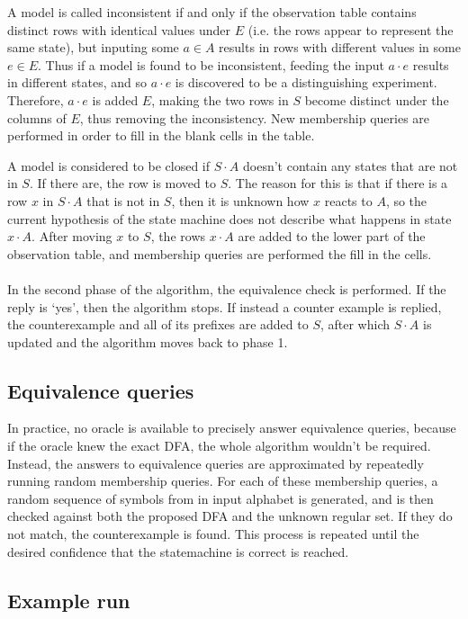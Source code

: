 \documentclass[multi,crop=false,class=article]{standalone}
\newcommand{\concat}{\cdot}
\begin{document}
A model is called inconsistent if and only if the observation table contains
distinct rows with identical values under $E$ (i.e. the rows appear to represent
the same state), but inputing some $a \in A$ results in rows with different
values in some $e \in E$. Thus if a model is found to be inconsistent, feeding
the input $a \concat e$ results in different states, and so $a \concat e$ is
discovered to be a distinguishing experiment. Therefore, $a \concat e$ is added
$E$, making the two rows in $S$ become distinct under the columns of $E$, thus
removing the inconsistency. New membership queries are performed in order to
fill in the blank cells in the table.

A model is considered to be closed if $S \concat A$ doesn't contain any states
that are not in $S$. If there are, the row is moved to $S$. The reason for this
is that if there is a row $x$ in $S \concat A$ that is not in $S$, then it is
unknown how $x$ reacts to $A$, so the current hypothesis of the state machine
does not describe what happens in state $x \concat A$. After moving $x$ to $S$,
the rows $x \concat A$ are added to the lower part of the observation table, and
membership queries are performed the fill in the cells. 
\\\\
In the second phase of the algorithm, the equivalence check is
performed. If the reply is `yes', then the algorithm stops. If instead a counter
example is replied, the counterexample and all of its prefixes are added to $S$,
after which $S \concat A$ is updated and the algorithm moves back to phase 1.

\subsection {Equivalence queries} In practice, no oracle is available to
precisely answer equivalence queries, because if the oracle knew the exact DFA,
the whole algorithm wouldn't be required. Instead, the answers to equivalence
queries are approximated by repeatedly running random membership queries. For
each of these membership queries, a random sequence of symbols from in input
alphabet is generated, and is then checked against both the proposed DFA and the
unknown regular set. If they do not match, the counterexample is found. This
process is repeated until the desired confidence that the statemachine is
correct is reached.

\subsection {Example run}
\end{document}
